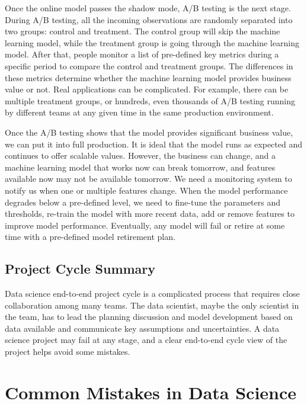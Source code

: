 \documentclass[
  12pt,
]{krantz}
\begin{document}
Once the online model passes the shadow mode, A/B testing is the next stage. During A/B testing, all the incoming observations are randomly separated into two groups: control and treatment. The control group will skip the machine learning model, while the treatment group is going through the machine learning model. After that, people monitor a list of pre-defined key metrics during a specific period to compare the control and treatment groups. The differences in these metrics determine whether the machine learning model provides business value or not. Real applications can be complicated. For example, there can be multiple treatment groups, or hundreds, even thousands of A/B testing running by different teams at any given time in the same production environment.

Once the A/B testing shows that the model provides significant business value, we can put it into full production. It is ideal that the model runs as expected and continues to offer scalable values. However, the business can change, and a machine learning model that works now can break tomorrow, and features available now may not be available tomorrow. We need a monitoring system to notify us when one or multiple features change. When the model performance degrades below a pre-defined level, we need to fine-tune the parameters and thresholds, re-train the model with more recent data, add or remove features to improve model performance. Eventually, any model will fail or retire at some time with a pre-defined model retirement plan.

\hypertarget{project-cycle-summary}{%
\subsection{Project Cycle Summary}\label{project-cycle-summary}}

Data science end-to-end project cycle is a complicated process that requires close collaboration among many teams. The data scientist, maybe the only scientist in the team, has to lead the planning discussion and model development based on data available and communicate key assumptions and uncertainties. A data science project may fail at any stage, and a clear end-to-end cycle view of the project helps avoid some mistakes.

\hypertarget{common-mistakes-in-data-science}{%
\section{Common Mistakes in Data Science}\label{common-mistakes-in-data-science}}
\end{document}
